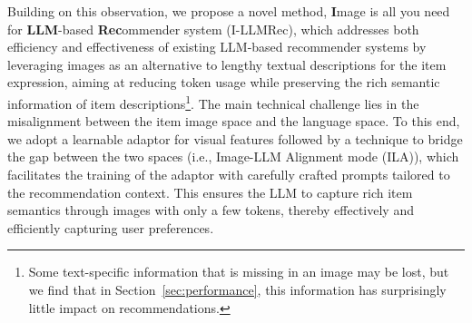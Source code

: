 \documentclass[sigconf]{acmart}
\newcommand{\proposed}{\textsf{I-LLMRec}}
\begin{document}
Building on this observation, we propose a novel method, \textbf{I}mage is all you need for \textbf{LLM}-based \textbf{Rec}ommender system (\proposed{}), which addresses both efficiency and effectiveness of existing LLM-based recommender systems by leveraging images as an alternative to lengthy textual descriptions for the item expression, aiming at reducing token usage while preserving the rich semantic information of item descriptions\footnote{Some text-specific information that is missing in an image may be lost, but we find that in Section~\ref{sec:performance}, this information has surprisingly little impact on recommendations.}. 
The main technical challenge lies in the misalignment between the item image space and the language space.
To this end, we adopt a learnable adaptor for visual features followed by
a technique to bridge the gap between the two spaces (i.e., Image-LLM Alignment mode (ILA)), which facilitates the training of the adaptor with carefully crafted prompts tailored to the recommendation context. 
This ensures the LLM to capture rich item semantics through images with only a few tokens, thereby effectively and efficiently capturing user preferences.

\end{document}
